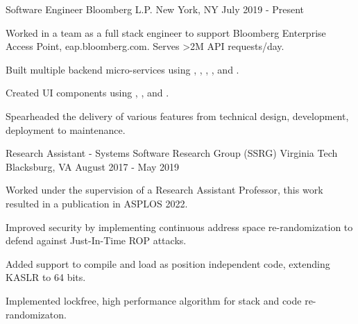 

\begin{cventries}
  \cventry
    {Software Engineer} %
    {Bloomberg L.P.} %
    {New York, NY} %
    {July 2019 - Present} %
    {
      \begin{cvitems} %
        \item {Worked in a team as a full stack engineer to support Bloomberg Enterprise Access Point, eap.bloomberg.com. Serves >2M API requests/day. }
        \item {Built multiple backend  micro-services using , , , ,  and  .}
        \item {Created UI components using , ,  and .}
        \item {Spearheaded the delivery of various features from technical design, development, deployment to maintenance. }
      \end{cvitems}
    }
  \cventry
    {Research Assistant - Systems Software Research Group (SSRG)} %
    {Virginia Tech} %
    {Blacksburg, VA} %
    {August 2017 - May 2019} %
    {
      \begin{cvitems} %
        \item {Worked under the supervision of a Research Assistant Professor, this work resulted in a publication in ASPLOS 2022.}
        \item {Improved  security by implementing  continuous address space re-randomization to defend against Just-In-Time ROP attacks.}
        \item {Added support to compile and load  as position independent code, extending KASLR to 64 bits.}
        \item {Implemented lockfree, high performance algorithm for stack and code re-randomizaton.}

\end{cvitems}}
\end{cventries}
